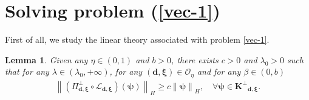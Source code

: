 \documentclass[a4paper,reqno,11pt,oneside]{amsart}
\numberwithin{equation}{section}
\renewcommand{\theequation}{\arabic{section}.\arabic{equation}}
\newtheorem{Lem}[Thm]{Lemma}
\begin{document}
\section{Solving problem (\ref{vec-1})} \label{appB}
\setcounter{equation}{0}
\renewcommand{\theequation}{B.\arabic{equation}}
First of all, we study the linear theory associated with problem  \eqref{vec-1}.
 {\begin{Lem}\label{invert}
 Given any $\eta\in(0,1)$ and $b>0$, there exists $c>0$ and $\lambda_0>0$ such that for any $\lambda \in (\lambda_0,+\infty)$, for any $\left(\bm{d}, \bm{\xi}\right)\in \mathcal{O}_\eta$ and for any $\beta\in (0,b)$ 
    \begin{align*}
        \left\|\left(\Pi^{\perp}_{\bm{d},\bm{\xi}}\circ\bm{\mathcal{L}}_{\bm{d},\bm{\xi}}\right)(\bm{\psi})\right\|_H\geq c\left\|\bm{\psi}\right\|_H, \quad \forall \bm{\psi}\in \bm{K^{\perp}}_{\bm{d},\bm{\xi}}.   \end{align*} 

\end{Lem}}
\end{document}
